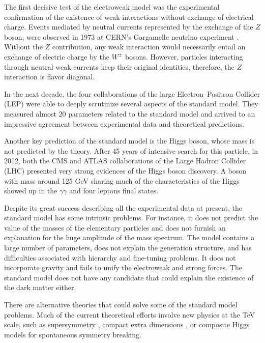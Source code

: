 The first decisive test of the electroweak model was the experimental confirmation of the existence of weak interactions without exchange of electrical charge. Events mediated by neutral currents represented by the exchange of the $Z$ boson, were observed in 1973 at CERN's Gargamelle neutrino experiment \cite{Hasert:1973ff}. Without the $Z$ contribution, any weak interaction would necessarily entail an exchange of electric charge by the $W^{\pm}$ bosons. However, particles interacting through neutral weak currents keep their original identities, therefore, the $Z$ interaction is flavor diagonal. 

In the next decade, the four collaborations of the large Electron--Positron Collider (LEP) were able to deeply scrutinize several aspects of the standard model. They measured almost 20 parameters related to the standard model and arrived to an impressive agreement between experimental data and theoretical predictions. 

Another key prediction of the standard model is the Higgs boson, whose mass is not predicted by the theory. After 45 years of intensive search for this particle, in 2012, both the CMS \cite{Chatrchyan:2012xdj} and ATLAS \cite{Aad:2012tfa} collaborations of the Large Hadron Collider (LHC) presented very strong evidences of the Higgs boson discovery. A boson with mass around 125 GeV sharing much of the characteristics of the Higgs showed up in the $\gamma\gamma$ and four leptons final states.
 
Despite its great success describing all the experimental data at present, the standard model has some intrinsic problems. For instance, it does not predict the value of the masses of the elementary particles and does not furnish an explanation for the huge amplitude of the mass spectrum. The model contains a large number of parameters, does not explain the generation structure, and has difficulties associated with hierarchy and fine-tuning problems. It does not incorporate gravity and fails to unify the electroweak and strong forces. The standard model does not have any candidate that could explain the existence of the dark matter either.

There are alternative theories that could solve some of the standard model problems. Much of the current theoretical efforts involve new physics at the TeV scale, such as supersymmetry \cite{Martin:1997ns}, compact extra dimensions \cite{Csaki:2004ay}, or composite Higgs models \cite{Agashe:2004rs} for spontaneous symmetry breaking. 

